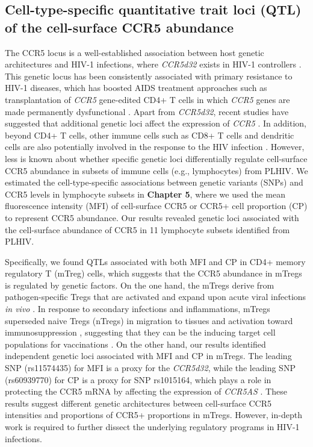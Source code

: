 \documentclass{book}
\begin{document}
\begin{refsection}
\subsection*{Cell-type-specific quantitative trait loci (QTL) of the cell-surface CCR5 abundance}
The CCR5 locus is a well-established association between host genetic architectures and HIV-1 infections, where \textit{CCR5d32} exists in HIV-1 controllers \cite{Brelot2018CCR5,Gervaix2002Response}.
This genetic locus has been consistently associated with primary resistance to HIV-1 diseases, which has boosted AIDS treatment approaches such as transplantation of \textit{CCR5} gene-edited CD4+ T cells in which \textit{CCR5} genes are made permanently dysfunctional \cite{Hütter2009Long,Tebas2021CCR5}.
Apart from \textit{CCR5d32}, recent studies have suggested that additional genetic loci affect the expression of \textit{CCR5} \cite{Kulkarni2019CCR5AS,Mangano2001Concordance}.
In addition, beyond CD4+ T cells, other immune cells such as CD8+ T cells and dendritic cells are also potentially involved in the response to the HIV infection \cite{McBrien2018Mechanisms,Walker2013Unravelling,Martin2018A}.
However, less is known about whether specific genetic loci differentially regulate cell-surface CCR5 abundance in subsets of immune cells (e.g., lymphocytes) from PLHIV.
We estimated the cell-type-specific associations between genetic variants (SNPs) and CCR5 levels in lymphocyte subsets in \textbf{Chapter 5}, where we used the mean fluorescence intensity (MFI) of cell-surface CCR5 or CCR5+ cell proportion (CP) to represent CCR5 abundance.
Our results revealed genetic loci associated with the cell-surface abundance of CCR5 in 11 lymphocyte subsets identified from PLHIV.

Specifically, we found QTLs associated with both MFI and CP in CD4+ memory regulatory T (mTreg) cells, which suggests that the CCR5 abundance in mTregs is regulated by genetic factors.
On the one hand, the mTregs derive from pathogen-specific Tregs that are activated and expand upon acute viral infections \textit{in vivo} \cite{Sanchez2012The,Lu2019Memory}.
In response to secondary infections and inflammations, mTregs superseded naive Tregs (nTregs) in migration to tissues and activation toward immunosuppression \cite{Sanchez2012The}, suggesting that they can be the inducing target cell populations for vaccinations \cite{Lu2019Memory}.
On the other hand, our results identified independent genetic loci associated with MFI and CP in mTregs.
The leading SNP (rs11574435) for MFI is a proxy for the \textit{CCR5d32}, while the leading SNP (rs60939770) for CP is a proxy for SNP rs1015164, which plays a role in protecting the CCR5 mRNA by affecting the expression of \textit{CCR5AS} \cite{Kulkarni2019CCR5AS}.
These results suggest different genetic architectures between cell-surface CCR5 intensities and proportions of CCR5+ proportions in mTregs.
However, in-depth work is required to further dissect the underlying regulatory programs in HIV-1 infections.


\end{refsection}
\end{document}
